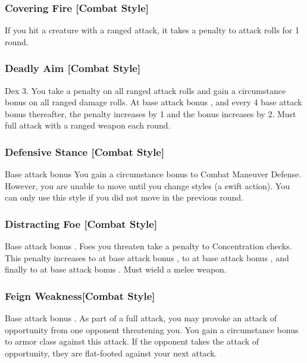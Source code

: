\subsubsection{Covering Fire [Combat Style]}
 If you hit a creature with a ranged attack, it takes a  penalty to attack rolls for 1 round.

\subsubsection{Deadly Aim [Combat Style]}
 Dex 3.
 You take a  penalty on all ranged attack rolls and gain a  circumstance bonus on all ranged damage rolls. At base attack bonus , and every 4 base attack bonus thereafter, the penalty increases by 1 and the bonus increases by 2.
 Must full attack with a ranged weapon each round.

\subsubsection{Defensive Stance [Combat Style]}
 Base attack bonus 
 You gain a  circumstance bonus to Combat Maneuver Defense. \babscalingdescription However, you are unable to move until you change styles (a swift action). You can only use this style if you did not move in the previous round.

\subsubsection{Distracting Foe [Combat Style]}
 Base attack bonus .
 Foes you threaten take a  penalty to Concentration checks. This penalty increases to  at base attack bonus , to  at base attack bonus , and finally to  at base attack bonus .
 Must wield a melee weapon.

\subsubsection{Feign Weakness[Combat Style]}
\featpre Base attack bonus .
\featben As part of a full attack, you may provoke an attack of opportunity from one opponent threatening you. You gain a  circumstance bonus to armor class against this attack. If the opponent takes the attack of opportunity, they are flat-footed against your next attack.

